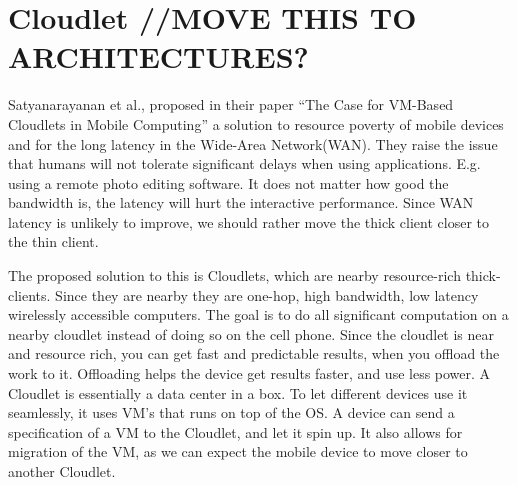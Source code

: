 

\section{Cloudlet //MOVE THIS TO ARCHITECTURES?} \label{cloudlet}
Satyanarayanan et al., proposed in their paper “The Case for VM-Based Cloudlets in Mobile Computing”\cite{satyanarayanan_case_2009} a solution to resource poverty of mobile devices and for the long latency in the Wide-Area Network(WAN). They raise the issue that humans will not tolerate significant delays when using applications. E.g. using a remote photo editing software. It does not matter how good the bandwidth is, the latency will hurt the interactive performance. Since WAN latency is unlikely to improve, we should rather move the thick client closer to the thin client. 

The proposed solution to this is Cloudlets, which are nearby resource-rich thick-clients. Since they are nearby they are one-hop, high bandwidth, low latency wirelessly accessible computers. The goal is to do all significant computation on a nearby cloudlet instead of doing so on the cell phone. Since the cloudlet is near and resource rich, you can get fast and predictable results, when you offload the work to it. Offloading helps the device get results faster, and use less power. A Cloudlet is essentially a data center in a box. To let different devices use it seamlessly, it uses VM’s that runs on top of the OS. A device can send a specification of a VM to the Cloudlet, and let it spin up. It also allows for migration of the VM, as we can expect the mobile device to move closer to another Cloudlet.
